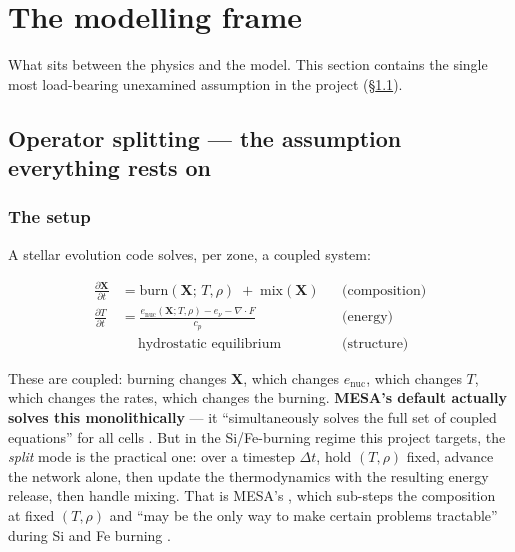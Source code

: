 \section{The modelling frame}
\label{part:frame}

What sits between the physics and the model. This section contains the single most
load-bearing unexamined assumption in the project (\S\ref{sec:splitting}).

\subsection{Operator splitting --- the assumption everything rests on}
\label{sec:splitting}

\subsubsection{The setup}
\label{sec:splitsetup}

A stellar evolution code solves, per zone, a coupled system:

\begin{align*}
\frac{\partial \mathbf{X}}{\partial t}
  &= \text{burn}(\mathbf{X};\,T,\rho) \;+\; \text{mix}(\mathbf{X})
  && \text{(composition)}\\
\frac{\partial T}{\partial t}
  &= \frac{e_{\text{nuc}}(\mathbf{X};T,\rho) - e_\nu - \nabla\!\cdot\!F}{c_p}
  && \text{(energy)}\\
&\quad\ \text{hydrostatic equilibrium} && \text{(structure)}
\end{align*}

These are coupled: burning changes $\mathbf{X}$, which changes
$e_{\text{nuc}}$, which changes $T$, which changes the rates, which changes the
burning. \textbf{MESA's default actually solves this monolithically} --- it
``simultaneously solves the full set of coupled equations'' for all cells
\citep{paxton2011}. But in the Si/Fe-burning regime this project targets, the
\emph{split} mode is the practical one: over a timestep $\Delta t$, hold
$(T, \rho)$ fixed, advance the network alone, then update the thermodynamics
with the resulting energy release, then handle mixing. That is MESA's
, which sub-steps the composition at fixed $(T, \rho)$ and
``may be the only way to make certain problems tractable'' during Si and Fe
burning \citep{jermyn2023}.

